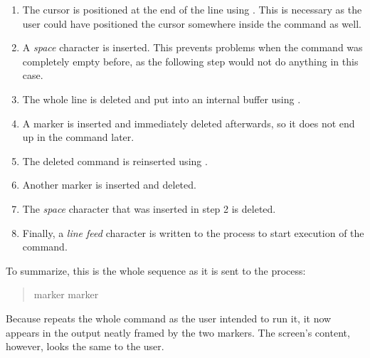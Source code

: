 \documentclass[paper=a4,twoside,abstract=on,cleardoublepage=empty,numbers=noenddot,toc=bib,toc=listof,12pt,appendixprefix=true]{scrreprt}
\begin{document}
\begin{enumerate}
    \item The cursor is positioned at the end of the line using . This is necessary as the user could have positioned the cursor somewhere inside the command as well.
    \item A \emph{space} character is inserted. This prevents problems when the command was completely empty before, as the following step would not do anything in this case.
    \item The whole line is deleted and put into an internal buffer using \mbox{}.
    \item A marker is inserted and immediately deleted afterwards, so it does not end up in the command later.
    \item The deleted command is reinserted using .
    \item Another marker is inserted and deleted.
    \item The \emph{space} character that was inserted in step 2 is deleted.
    \item Finally, a \emph{line feed} character is written to the process to start execution of the command.
\end{enumerate}

To summarize, this is the whole sequence as it is sent to the process:

\begin{quote}
       marker   marker   \keys{\return}
\end{quote}

Because  repeats the whole command as the user intended to run it, it now appears in the output neatly framed by the two markers. The screen's content, however, looks the same to the user.
\end{document}

